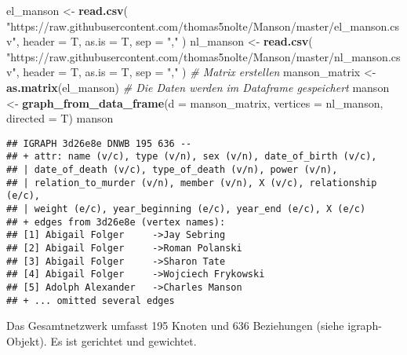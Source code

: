 \documentclass[
]{article}
\newenvironment{Shaded}{\begin{snugshade}}{\end{snugshade}}
\newcommand{\CommentTok}[1]{\textcolor[rgb]{0.56,0.35,0.01}{\textit{#1}}}
\newcommand{\DataTypeTok}[1]{\textcolor[rgb]{0.13,0.29,0.53}{#1}}
\newcommand{\KeywordTok}[1]{\textcolor[rgb]{0.13,0.29,0.53}{\textbf{#1}}}
\newcommand{\NormalTok}[1]{#1}
\newcommand{\StringTok}[1]{\textcolor[rgb]{0.31,0.60,0.02}{#1}}
\begin{document}
\begin{Shaded}
\begin{Highlighting}[]
\NormalTok{el_manson <-}
\StringTok{  }\KeywordTok{read.csv}\NormalTok{(}
    \StringTok{"https://raw.githubusercontent.com/thomas5nolte/Manson/master/el_manson.csv"}\NormalTok{,}
    \DataTypeTok{header =}\NormalTok{ T,}
    \DataTypeTok{as.is =}\NormalTok{ T,}
    \DataTypeTok{sep =} \StringTok{","}
\NormalTok{  )}
\NormalTok{nl_manson <-}
\StringTok{  }\KeywordTok{read.csv}\NormalTok{(}
    \StringTok{"https://raw.githubusercontent.com/thomas5nolte/Manson/master/nl_manson.csv"}\NormalTok{,}
    \DataTypeTok{header =}\NormalTok{ T,}
    \DataTypeTok{as.is =}\NormalTok{ T,}
    \DataTypeTok{sep =} \StringTok{","}
\NormalTok{  )}
\CommentTok{# Matrix erstellen}
\NormalTok{manson_matrix <-}\StringTok{ }\KeywordTok{as.matrix}\NormalTok{(el_manson)}
\CommentTok{# Die Daten werden im Dataframe gespeichert}
\NormalTok{manson <-}
\StringTok{  }\KeywordTok{graph_from_data_frame}\NormalTok{(}\DataTypeTok{d =}\NormalTok{ manson_matrix,}
                        \DataTypeTok{vertices =}\NormalTok{ nl_manson,}
                        \DataTypeTok{directed =}\NormalTok{ T)}
\NormalTok{manson}
\end{Highlighting}
\end{Shaded}

\begin{verbatim}
## IGRAPH 3d26e8e DNWB 195 636 -- 
## + attr: name (v/c), type (v/n), sex (v/n), date_of_birth (v/c),
## | date_of_death (v/c), type_of_death (v/n), power (v/n),
## | relation_to_murder (v/n), member (v/n), X (v/c), relationship (e/c),
## | weight (e/c), year_beginning (e/c), year_end (e/c), X (e/c)
## + edges from 3d26e8e (vertex names):
## [1] Abigail Folger     ->Jay Sebring       
## [2] Abigail Folger     ->Roman Polanski    
## [3] Abigail Folger     ->Sharon Tate       
## [4] Abigail Folger     ->Wojciech Frykowski
## [5] Adolph Alexander   ->Charles Manson    
## + ... omitted several edges
\end{verbatim}

Das Gesamtnetzwerk umfasst 195 Knoten und 636 Beziehungen (siehe
igraph-Objekt). Es ist gerichtet und gewichtet.
\end{document}
